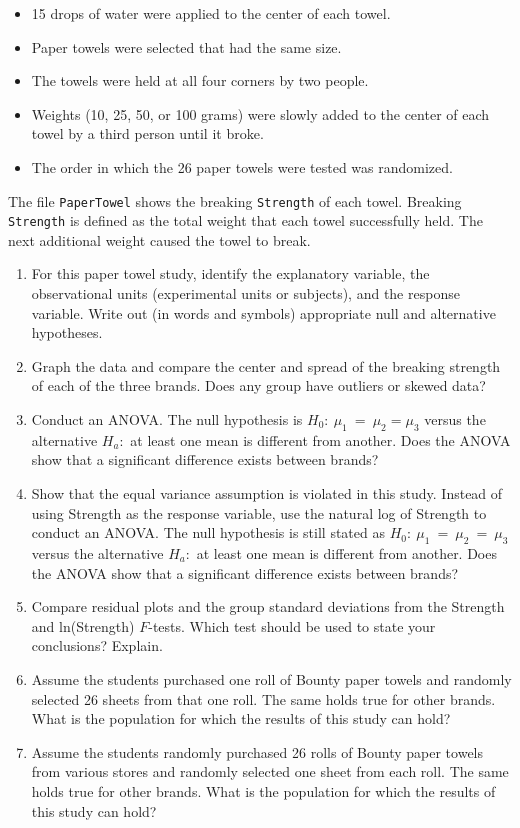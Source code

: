 \documentclass[
]{report}
\begin{document}
\begin{enumerate}
\begin{itemize}
  \item 15 drops of water were applied to the center of each towel.
  \item Paper towels were selected that had the same size.
  \item The towels were held at all four corners by two people.
  \item Weights (10, 25, 50, or 100 grams) were slowly added to the center of each towel by a third person until it broke.
  \item The order in which the 26 paper towels were tested was randomized.
\end{itemize}

The file \texttt{PaperTowel} shows the breaking \texttt{Strength} of each towel. Breaking \texttt{Strength} is defined as the total weight that each towel successfully held. The next additional weight caused the towel to break.

  \begin{enumerate}
    \item For this paper towel study, identify the explanatory variable, the observational units (experimental units or subjects), and the response variable. Write out (in words and symbols) appropriate null and alternative hypotheses.
      \item Graph the data and compare the center and spread of the breaking strength of each of the three brands. Does any group have outliers or skewed data?
      \item Conduct an ANOVA. The null hypothesis is $\scriptstyle H_0:\  \mu_1 \ =\  \mu_2 = \mu_3$ versus the alternative $\scriptstyle H_a\colon$ at least one mean is different from another. Does the ANOVA show that a significant difference exists between brands?
      \item Show that the equal variance assumption is violated in this study. Instead of using Strength as the response variable, use the natural log of Strength to conduct an ANOVA. The null hypothesis is still stated as $\scriptstyle H_0:\  \mu_1 \ =\  \mu_2 \ =\  \mu_3$ versus the alternative $\scriptstyle H_a:$ at least one mean is different from another. Does the ANOVA show that a significant difference exists between brands?
      \item Compare residual plots and the group standard deviations from the Strength and ln(Strength) $\scriptstyle F$-tests. Which test should be used to state your conclusions? Explain.
      \item Assume the students purchased one roll of Bounty paper towels and randomly selected 26 sheets from that one roll. The same holds true for other brands. What is the population for which the results of this study can hold?
      \item Assume the students randomly purchased 26 rolls of Bounty paper towels from various stores and randomly selected one sheet from each roll. The same holds true for other brands. What is the population for which the results of this study can hold?
    \end{enumerate}


\end{enumerate}
\end{document}
